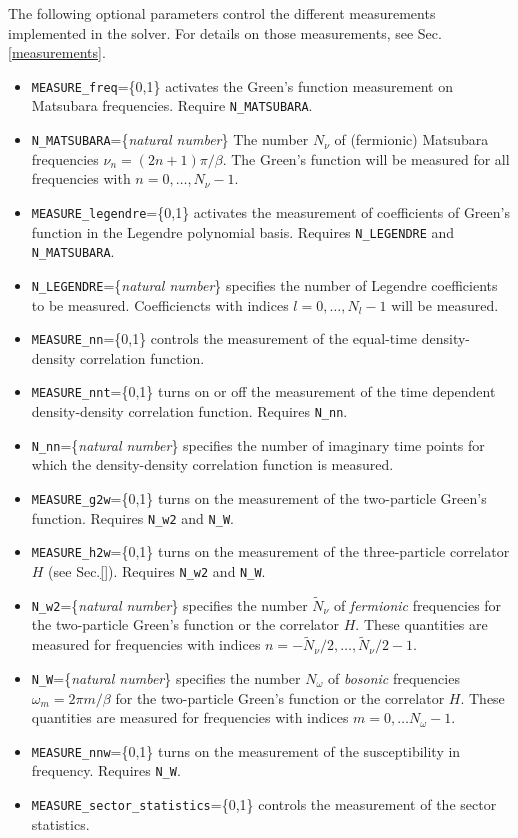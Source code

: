 \documentclass[aps,prb,floatfix,superscriptaddress,twocolumn,notitlepage]{revtex4-1}
\begin{document}
The following optional parameters control the different measurements implemented in the solver. For details on those measurements, see Sec. \ref{measurements}.
\begin{itemize}
\item \verb#MEASURE_freq#=\{0,1\} activates the Green's function measurement on Matsubara frequencies. Require \verb#N_MATSUBARA#.
\item \verb#N_MATSUBARA#=\{\emph{natural number}\} The number $N_{\nu}$ of (fermionic) Matsubara frequencies $\nu_{n}=(2n+1)\pi/\beta$. The Green's function will be measured for all frequencies with $n=0,\ldots,N_{\nu}-1$.
\item \verb#MEASURE_legendre#=\{0,1\} activates the measurement of coefficients of Green's function in the Legendre polynomial basis. Requires \verb#N_LEGENDRE# and \verb#N_MATSUBARA#.
\item \verb#N_LEGENDRE#=\{\emph{natural number}\} specifies the number of Legendre coefficients to be measured. Coefficiencts with indices $l=0,\ldots,N_{l}-1$ will be measured.
\item \verb#MEASURE_nn#=\{0,1\} controls the measurement of the equal-time density-density correlation function.
\item \verb#MEASURE_nnt#=\{0,1\} turns on or off the measurement of the time dependent density-density correlation function. Requires \verb#N_nn#.
\item \verb#N_nn#=\{\emph{natural number}\} specifies the number of imaginary time points for which the density-density correlation function is measured.
\item \verb#MEASURE_g2w#=\{0,1\} turns on the measurement of the two-particle Green's function. Requires \verb#N_w2# and \verb#N_W#.
\item \verb#MEASURE_h2w#=\{0,1\} turns on the measurement of the three-particle correlator $H$ (see Sec.\ref{}). Requires \verb#N_w2# and \verb#N_W#.
\item \verb#N_w2#=\{\emph{natural number}\} specifies the number $\tilde{N}_{\nu}$ of \emph{fermionic} frequencies for the two-particle Green's function or the correlator $H$. These quantities are measured for frequencies with indices $n=-\tilde{N}_{\nu}/2,\ldots,\tilde{N}_{\nu}/2-1$.
\item \verb#N_W#=\{\emph{natural number}\} specifies the number $N_{\omega}$ of \emph{bosonic} frequencies $\omega_{m}=2\pi m/\beta$ for the two-particle Green's function or the correlator $H$. These quantities are measured for frequencies with indices $m=0,\ldots N_{\omega}-1$.
\item \verb#MEASURE_nnw#=\{0,1\} turns on the measurement of the susceptibility in frequency. Requires \verb#N_W#.
\item \verb#MEASURE_sector_statistics#=\{0,1\} controls the measurement of the sector statistics.


\end{itemize}
\end{document}
